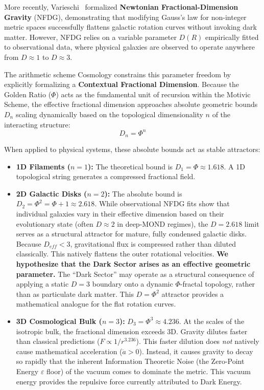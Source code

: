 More recently, Varieschi~\cite{varieschi2020} formalized \textbf{Newtonian Fractional-Dimension Gravity} (NFDG), demonstrating that modifying Gauss's law for non-integer metric spaces successfully flattens galactic rotation curves without invoking dark matter. However, NFDG relies on a variable parameter $D(R)$ empirically fitted to observational data, where physical galaxies are observed to operate anywhere from $D \approx 1$ to $D \approx 3$.

The arithmetic scheme Cosmology constrains this parameter freedom by explicitly formalizing a \textbf{Contextual Fractional Dimension}. Because the Golden Ratio ($\Phi$) acts as the fundamental unit of recursion within the Motivic Scheme, the effective fractional dimension approaches absolute geometric bounds $D_n$ scaling dynamically based on the topological dimensionality $n$ of the interacting structure:
\begin{equation}
    D_n = \Phi^n
\end{equation}

When applied to physical systems, these absolute bounds act as stable attractors:
\begin{itemize}
    \item \textbf{1D Filaments ($n=1$):} The theoretical bound is $D_1 = \Phi \approx 1.618$. A 1D topological string generates a compressed fractional field.
    \item \textbf{2D Galactic Disks ($n=2$):} The absolute bound is $D_2 = \Phi^2 = \Phi + 1 \approx 2.618$. While observational NFDG fits show that individual galaxies vary in their effective dimension based on their evolutionary state (often $D \approx 2$ in deep-MOND regimes), the $D = 2.618$ limit serves as a structural attractor for mature, fully condensed galactic disks. Because $D_{eff} < 3$, gravitational flux is compressed rather than diluted classically. This natively flattens the outer rotational velocities. \textbf{We hypothesize that the Dark Sector arises as an effective geometric parameter.} The ``Dark Sector'' may operate as a structural consequence of applying a static $D=3$ boundary onto a dynamic $\Phi$-fractal topology, rather than as particulate dark matter. This $D = \Phi^2$ attractor provides a mathematical analogue for the flat rotation curves. 
    \item \textbf{3D Cosmological Bulk ($n=3$):} $D_3 = \Phi^3 \approx 4.236$. At the scales of the isotropic bulk, the fractional dimension exceeds 3D. Gravity dilutes faster than classical predictions ($F \propto 1/r^{3.236}$). This faster dilution does \emph{not} natively cause mathematical acceleration ($\ddot{a} > 0$). Instead, it causes gravity to decay so rapidly that the inherent Information Theoretic Noise (the Zero-Point Energy $\varepsilon$ floor) of the vacuum comes to dominate the metric. This vacuum energy provides the repulsive force currently attributed to Dark Energy.
\end{itemize}

